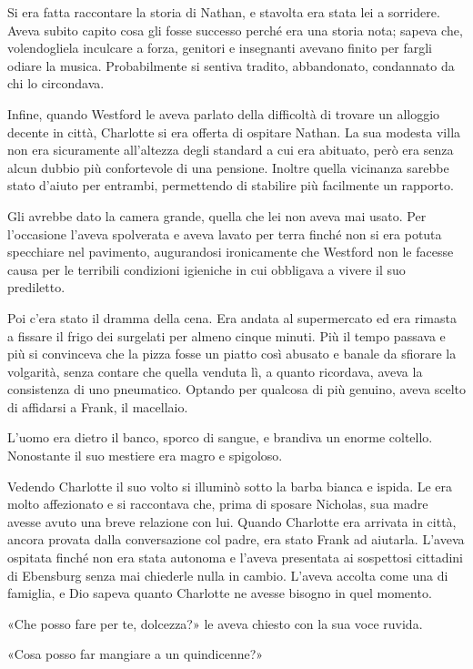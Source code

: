 \documentclass[a4paper,oneside,11pt]{memoir}
\begin{document}
Si era fatta raccontare la storia di Nathan, e stavolta era stata lei a
sorridere. Aveva subito capito cosa gli fosse successo perché era una storia
nota; sapeva che, volendogliela inculcare a forza, genitori e insegnanti avevano
finito per fargli odiare la musica. Probabilmente si sentiva tradito,
abbandonato, condannato da chi lo circondava.

Infine, quando Westford le aveva parlato della difficoltà di trovare un alloggio
decente in città, Charlotte si era offerta di ospitare Nathan. La sua modesta
villa non era sicuramente all'altezza degli standard a cui era abituato, però
era senza alcun dubbio più confortevole di una pensione. Inoltre quella
vicinanza sarebbe stato d'aiuto per entrambi, permettendo di stabilire più
facilmente un rapporto.

Gli avrebbe dato la camera grande, quella che lei non aveva mai usato. Per
l'occasione l'aveva spolverata e aveva lavato per terra finché non si era potuta
specchiare nel pavimento, augurandosi ironicamente che Westford non le facesse
causa per le terribili condizioni igieniche in cui obbligava a vivere il suo
prediletto.

Poi c'era stato il dramma della cena. Era andata al supermercato ed era rimasta
a fissare il frigo dei surgelati per almeno cinque minuti. Più il tempo passava
e più si convinceva che la pizza fosse un piatto così abusato e banale da
sfiorare la volgarità, senza contare che quella venduta lì, a quanto ricordava,
aveva la consistenza di uno pneumatico. Optando per qualcosa di più genuino,
aveva scelto di affidarsi a Frank, il macellaio.

L'uomo era dietro il banco, sporco di sangue, e brandiva un enorme coltello.
Nonostante il suo mestiere era magro e spigoloso.

Vedendo Charlotte il suo volto si illuminò sotto la barba bianca e ispida. Le
era molto affezionato e si raccontava che, prima di sposare Nicholas, sua madre
avesse avuto una breve relazione con lui. Quando Charlotte era arrivata in
città, ancora provata dalla conversazione col padre, era stato Frank ad
aiutarla. L'aveva ospitata finché non era stata autonoma e l'aveva presentata ai
sospettosi cittadini di Ebensburg senza mai chiederle nulla in cambio. L'aveva
accolta come una di famiglia, e Dio sapeva quanto Charlotte ne avesse bisogno in
quel momento.

«Che posso fare per te, dolcezza?» le aveva chiesto con la sua voce ruvida.

«Cosa posso far mangiare a un quindicenne?»
\end{document}
